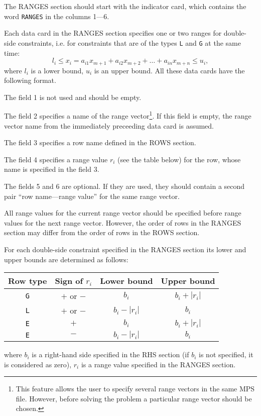 The RANGES section should start with the indicator card, which contains
the word \verb|RANGES| in the columns 1---6.

Each data card in the RANGES section specifies one or two ranges for
double-side constraints, i.e. for constraints that are of the types
\verb|L| and \verb|G| at the same time:
$$l_i \leq x_i = a_{i1}x_{m+1} + a_{i2}x_{m+2} + \dots + a_{in}x_{m+n}
\leq u_i,$$
where $l_i$ is a lower bound, $u_i$ is an upper bound. All these data
cards have the following format.

The field 1 is not used and should be empty.

The field 2 specifies a name of the range vector\footnote{This feature
allows the user to specify several range vectors in the same MPS file.
However, before solving the problem a particular range vector should be
chosen.}. If this field is empty, the range vector name from the
immediately preceeding data card is assumed.

The field 3 specifies a row name defined in the ROWS section.

The field 4 specifies a range value $r_i$ (see the table below) for the
row, whose name is specified in the field 3.

The fields 5 and 6 are optional. If they are used, they should contain
a second pair ``row name---range value'' for the same range vector.

All range values for the current range vector should be specified before
range values for the next range vector. However, the order of rows in
the RANGES section may differ from the order of rows in the ROWS
section.

For each double-side constraint specified in the RANGES section its
lower and upper bounds are determined as follows:

\begin{center}
\begin{tabular}{cccc}
Row type & Sign of $r_i$ & Lower bound & Upper bound \\
\hline
{\tt G} & $+$ or $-$ & $b_i$ & $b_i + |r_i|$ \\
{\tt L} & $+$ or $-$ & $b_i - |r_i|$ & $b_i$ \\
{\tt E} & $+$ & $b_i$ & $b_i + |r_i|$ \\
{\tt E} & $-$ & $b_i - |r_i|$ & $b_i$ \\
\end{tabular}
\end{center}

\noindent
where $b_i$ is a right-hand side specified in the RHS section (if $b_i$
is not specified, it is considered as zero), $r_i$ is a range value
specified in the RANGES section.

